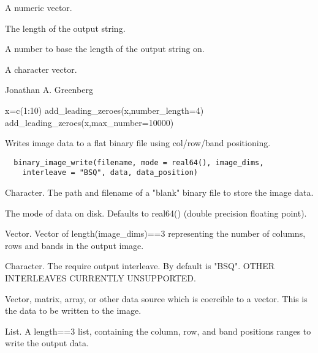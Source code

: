 \documentclass[a4paper]{book}
\begin{document}
%
\begin{Arguments}
\begin{ldescription}
\item[\code{number}] A numeric vector.

\item[\code{number\_length}] The length of the output string.

\item[\code{max\_number}] A number to base the length of the
output string on.
\end{ldescription}
\end{Arguments}
%
\begin{Value}
A character vector.
\end{Value}
%
\begin{Author}\relax
Jonathan A. Greenberg
\end{Author}
%
\begin{Examples}
\begin{ExampleCode}
x=c(1:10)
add_leading_zeroes(x,number_length=4)
add_leading_zeroes(x,max_number=10000)
\end{ExampleCode}
\end{Examples}
%
\begin{Description}\relax
Writes image data to a flat binary file using
col/row/band positioning.
\end{Description}
%
\begin{Usage}
\begin{verbatim}
  binary_image_write(filename, mode = real64(), image_dims,
    interleave = "BSQ", data, data_position)
\end{verbatim}
\end{Usage}
%
\begin{Arguments}
\begin{ldescription}
\item[\code{filename}] Character.  The path and filename of a
"blank" binary file to store the image data.

\item[\code{mode}] The mode of data on disk.  Defaults to
real64() (double precision floating point).

\item[\code{image\_dims}] Vector. Vector of length(image\_dims)==3
representing the number of columns, rows and bands in the
output image.

\item[\code{interleave}] Character. The require output
interleave.  By default is "BSQ". OTHER INTERLEAVES
CURRENTLY UNSUPPORTED.

\item[\code{data}] Vector, matrix, array, or other data source
which is coercible to a vector. This is the data to be
written to the image.

\item[\code{data\_position}] List. A length==3 list, containing
the column, row, and band positions ranges to write the
output data.
\end{ldescription}
\end{Arguments}
\end{document}
